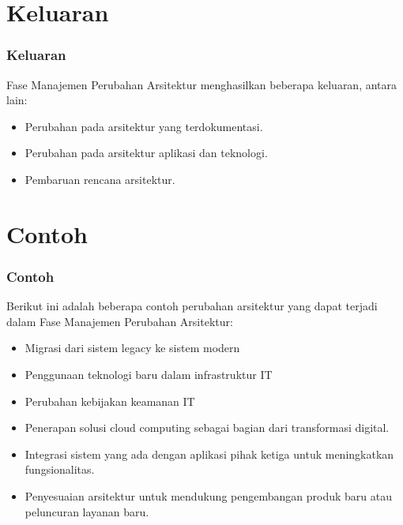 \documentclass{beamer}
\begin{document}
	\section{Keluaran}
	\begin{frame}
		\frametitle{Keluaran}
		Fase Manajemen Perubahan Arsitektur menghasilkan beberapa keluaran, antara lain:
		\begin{itemize}
			\item Perubahan pada arsitektur yang terdokumentasi.
			\item Perubahan pada arsitektur aplikasi dan teknologi.
			\item Pembaruan rencana arsitektur.
		\end{itemize}
	\end{frame}
	
	\section{Contoh}
	\begin{frame}
		\frametitle{Contoh}
		Berikut ini adalah beberapa contoh perubahan arsitektur yang dapat terjadi dalam Fase Manajemen Perubahan Arsitektur:
		\begin{itemize}
			\item Migrasi dari sistem legacy ke sistem modern
			\item Penggunaan teknologi baru dalam infrastruktur IT
			\item Perubahan kebijakan keamanan IT
				\item Penerapan solusi cloud computing sebagai bagian dari transformasi digital.
				\item Integrasi sistem yang ada dengan aplikasi pihak ketiga untuk meningkatkan fungsionalitas.
				\item Penyesuaian arsitektur untuk mendukung pengembangan produk baru atau peluncuran layanan baru.
			\end{itemize}
		\end{frame}
	
\end{document}
